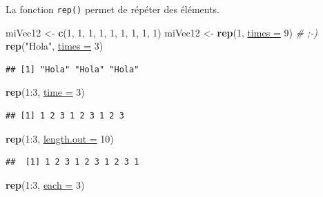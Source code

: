 \documentclass[twoside,symmetric]{book}
\newenvironment{Shaded}{}{}
\newcommand{\CommentTok}[1]{\textit{#1}}
\newcommand{\DataTypeTok}[1]{\underline{#1}}
\newcommand{\DecValTok}[1]{#1}
\newcommand{\KeywordTok}[1]{\textbf{#1}}
\newcommand{\NormalTok}[1]{#1}
\newcommand{\OperatorTok}[1]{#1}
\newcommand{\StringTok}[1]{#1}
\begin{document}
La fonction \texttt{rep()} permet de répéter des éléments.

\begin{Shaded}
\begin{Highlighting}[]
\NormalTok{miVec12 <-}\StringTok{ }\KeywordTok{c}\NormalTok{(}\DecValTok{1}\NormalTok{, }\DecValTok{1}\NormalTok{, }\DecValTok{1}\NormalTok{, }\DecValTok{1}\NormalTok{, }\DecValTok{1}\NormalTok{, }\DecValTok{1}\NormalTok{, }\DecValTok{1}\NormalTok{, }\DecValTok{1}\NormalTok{, }\DecValTok{1}\NormalTok{)}
\NormalTok{miVec12 <-}\StringTok{ }\KeywordTok{rep}\NormalTok{(}\DecValTok{1}\NormalTok{, }\DataTypeTok{times =} \DecValTok{9}\NormalTok{) }\CommentTok{# ;-)}
\KeywordTok{rep}\NormalTok{(}\StringTok{"Hola"}\NormalTok{, }\DataTypeTok{times =} \DecValTok{3}\NormalTok{)}
\end{Highlighting}
\end{Shaded}

\begin{verbatim}
## [1] "Hola" "Hola" "Hola"
\end{verbatim}

\begin{Shaded}
\begin{Highlighting}[]
\KeywordTok{rep}\NormalTok{(}\DecValTok{1}\OperatorTok{:}\DecValTok{3}\NormalTok{, }\DataTypeTok{time =} \DecValTok{3}\NormalTok{)}
\end{Highlighting}
\end{Shaded}

\begin{verbatim}
## [1] 1 2 3 1 2 3 1 2 3
\end{verbatim}

\begin{Shaded}
\begin{Highlighting}[]
\KeywordTok{rep}\NormalTok{(}\DecValTok{1}\OperatorTok{:}\DecValTok{3}\NormalTok{, }\DataTypeTok{length.out =} \DecValTok{10}\NormalTok{)}
\end{Highlighting}
\end{Shaded}

\begin{verbatim}
##  [1] 1 2 3 1 2 3 1 2 3 1
\end{verbatim}

\begin{Shaded}
\begin{Highlighting}[]
\KeywordTok{rep}\NormalTok{(}\DecValTok{1}\OperatorTok{:}\DecValTok{3}\NormalTok{, }\DataTypeTok{each =} \DecValTok{3}\NormalTok{)}
\end{Highlighting}
\end{Shaded}
\end{document}
